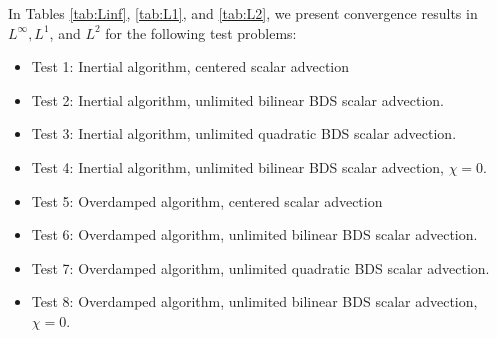 \documentclass[final]{siamltex}
\begin{document}
In Tables \ref{tab:Linf}, \ref{tab:L1}, and \ref{tab:L2},
we present convergence results in $L^\infty, L^1$, and $L^2$ for the following
test problems:
\begin{itemize}
\item Test 1: Inertial algorithm, centered scalar advection
\item Test 2: Inertial algorithm, unlimited bilinear BDS scalar advection.
\item Test 3: Inertial algorithm, unlimited quadratic BDS scalar advection.
\item Test 4: Inertial algorithm, unlimited bilinear BDS scalar advection, $\chi=0$.
\item Test 5: Overdamped algorithm, centered scalar advection
\item Test 6: Overdamped algorithm, unlimited bilinear BDS scalar advection.
\item Test 7: Overdamped algorithm, unlimited quadratic BDS scalar advection.
\item Test 8: Overdamped algorithm, unlimited bilinear BDS scalar advection, $\chi=0$.
\end{itemize}
\end{document}
